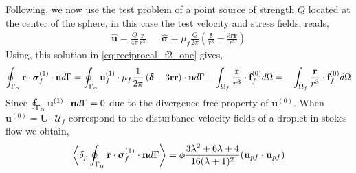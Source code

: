 Following, \citet{stone2001inertial} we now use the test problem of a point source of strength $Q$ located at the center of the sphere, in this case the test velocity  and stress fields, reads, 
\begin{align*}
    \hat{\textbf{u}} = \frac{Q}{4\pi} \frac{\textbf{r}}{r^3}
    && \hat{\bm\sigma} = \mu_f \frac{Q}{2\pi}\left(
        \frac{\bm\delta}{r^3}
        - \frac{3 \textbf{rr}}{r^5}
    \right)
\end{align*}
Using, this solution in \ref{eq:reciprocal_f2_one} gives, 
\begin{align*}
    \oint_{\Gamma_{\alpha}}  \textbf{r}\cdot  \bm\sigma_f^{(1)} \cdot \textbf{n} d\Gamma
    = 
    \oint_{\Gamma_{\alpha}} \textbf{u}_f^{(1)} \cdot  \mu_f \frac{1}{2\pi}\left(
        \bm\delta
        - 3 \textbf{rr}
    \right) \cdot \textbf{n} d\Gamma
    - \int_{\Omega_f}  \frac{\textbf{r}}{r^3}\cdot  \textbf{f}^{(0)}_f d\Omega
    = 
    - \int_{\Omega_f}  \frac{\textbf{r}}{r^3}\cdot  \textbf{f}^{(0)}_f d\Omega\\
\end{align*}
Since $\oint_{\Gamma_{\alpha}} \textbf{u}^{(1)} \cdot \textbf{n} d\Gamma =0$ due to the divergence free property of $\textbf{u}^{(0)}$. 
When $\textbf{u}^{(0)} = \textbf{U}\cdot \mathcal{U}_f$ correspond to the disturbance velocity fields of a droplet in stokes flow we obtain, 
\begin{equation*}
    \left<\delta_p \oint_{\Gamma_{\alpha}}  \textbf{r}\cdot  \bm\sigma_f^{(1)} \cdot \textbf{n} d\Gamma\right>
    = \phi \frac{3\lambda^2 + 6\lambda + 4}{16(\lambda +1 )^2} (\textbf{u}_{pf}\cdot \textbf{u}_{pf})
\end{equation*}